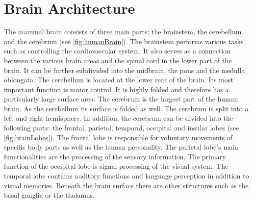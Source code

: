 \section{Brain Architecture}
%
The mammal brain consists of three main parts: the brainstem, the cerebellum and the cerebrum (see \cref{fig:humanBrain}).
%
The brainstem performs various tasks such as controlling the cardiovascular system. It also serves as a connection between the various brain areas and the spinal cord in the lower part of the brain.
It can be further subdivided into the midbrain, the pons and the medulla oblongata.
The cerebellum is located at the lower rear of the brain.
Its most important function is motor control.
It is highly folded and therefore has a particularly large surface area.
The cerebrum is the largest part of the human brain.
As the cerebellum its surface is folded as well.
The cerebrum is split into a left and right hemisphere.
In addition, the cerebrum can be divided into the following parts:
the frontal, parietal, temporal, occipital and insular lobes (see \cref{fig:brainLobes}).
The frontal lobe is responsible for voluntary movements of specific body parts as well as the human personality.
The parietal lobe's main functionalities are the processing of the sensory information.
The primary function of the occipital lobe is signal processing of the visual system.
The temporal lobe contains auditory functions and language perception in addition to visual memories.
Beneath the brain surface there are other structures such as the basal ganglia or the thalamus.
\par
%
